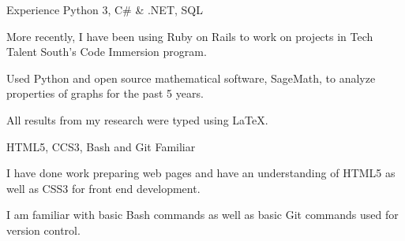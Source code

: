 \begin{cventries}
  \cventry
    {Experience}
    {Python 3, C\# \& .NET, SQL}
    {}
    {}
    {
      \begin{cvitems}
	\item More recently, I have been using Ruby on Rails to work on 
	      projects in Tech Talent South's Code Immersion program.
        \item Used Python and open source mathematical software, SageMath, 
	      to analyze properties of graphs for the past 5 years.
	\item All results from my research were typed using LaTeX.
      \end{cvitems}
    }
  \cventry
    {HTML5, CCS3, Bash and Git}
    {Familiar}
    {}
    {}
    {
      \begin{cvitems}
	\item I have done work preparing web pages and 
	      have an understanding of HTML5 as well as CSS3 for 
	      front end development.
	\item I am familiar with basic Bash commands as well as basic Git 
	      commands used for version control.
      \end{cvitems}
    }
\vspace*{-2pt}
\end{cventries}

